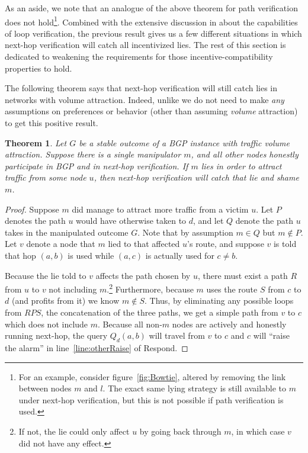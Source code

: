 \documentclass[10pt]{article}
\newtheorem{theorem}{Theorem}
\begin{document}
  As an aside, we note that an analogue of the above theorem for path
  verification does not hold\footnote{
    For an example, consider figure~\ref{fig:Bowtie}, altered by removing the
    link between nodes $m$ and $l$. The exact same lying strategy is still
    available to $m$ under next-hop verification, but this is not possible if
    path verification is used.
  }.
  Combined with the extensive discussion in \cite{Attraction} about the capabilities of loop verification,
  the previous result gives us a few different situations in which
  next-hop verification will catch all incentivized lies.
  The rest of this section is dedicated to weakening the requirements
  for those incentive-compatibility properties to hold.

  The following theorem says that next-hop verification will still catch lies
  in networks with volume attraction.
  Indeed, unlike \cite{Attraction} we do not need to make \emph{any} assumptions
  on preferences or behavior (other than assuming \emph{volume} attraction)
  to get this positive result.
  \begin{theorem}
    Let $G$ be a stable outcome of a BGP instance with traffic volume attraction.
    Suppose there is a single manipulator $m$,
    and all other nodes honestly participate in BGP and in next-hop verification.
    If $m$ lies in order to attract traffic from some node $u$,
    then next-hop verification will catch that lie and shame $m$.
  \end{theorem}
  \begin{proof}
    Suppose $m$ did manage to attract more traffic from a victim $u$.
    Let $P$ denotes the path $u$ would have otherwise taken to $d$,
    and let $Q$ denote the path $u$ takes in the manipulated outcome $G$.
    Note that by assumption $m\in Q$ but $m\notin P$.
    Let $v$ denote a node that $m$ lied to that affected $u$'s route, and suppose $v$ is told
    that hop $(a,b)$ is used while $(a,c)$ is actually used for $c\ne b$.

    Because the lie told to $v$ affects the path chosen by $u$,
    there must exist a path $R$ from $u$ to $v$ not including $m$.\footnote{If not, the lie could only affect $u$ by going back through $m$, in which case $v$ did not have any effect.}
    Furthermore, because $m$ uses the route $S$ from $c$ to $d$
    (and profits from it) we know $m\notin S$.
    Thus, by eliminating any possible loops from $RPS$,
    the concatenation of the three paths,
    we get a simple path from $v$ to $c$ which does not include $m$.
    Because all non-$m$ nodes are actively and honestly running next-hop,
    the query $Q_d(a,b)$ will travel from $v$ to $c$ and $c$ will
    ``raise the alarm'' in line~\ref{line:otherRaise} of {\sc
    Respond}.
  \end{proof}
\end{document}
